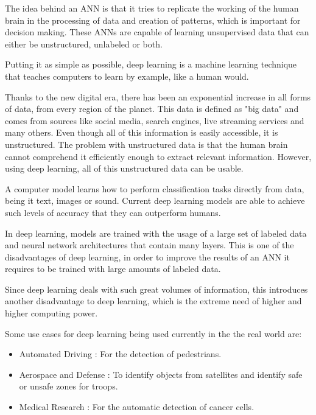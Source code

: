     \par The idea behind an ANN is that it tries to replicate the working of the human brain in the processing of data and creation of patterns, which is important for decision making. These ANNs are capable of learning unsupervised data that can either be unstructured, unlabeled or both. 
    
    \par Putting it as simple as possible, deep learning is a machine learning technique that teaches computers to learn by example, like a human would. \cite{mathworks_deeplearning}


    \par Thanks to the new digital era, there has been an exponential increase in all forms of data, from every region of the planet. This data is defined as "big data" and comes from sources like social media, search engines, live streaming services and many others. Even though all of this information is easily accessible, it is unstructured. The problem with unstructured data is that the human brain cannot comprehend it efficiently enough to extract relevant information. However, using deep learning, all of this unstructured data can be usable.

    \par A computer model learns how to perform classification tasks directly from data, being it text, images or sound. Current deep learning models are able to achieve such levels of accuracy that they can outperform humans.

    \par In deep learning, models are trained with the usage of a large set of labeled data and neural network architectures that contain many layers. This is one of the disadvantages of deep learning, in order to improve the results of an ANN it requires to be trained with large amounts of labeled data.

    \par Since deep learning deals with such great volumes of information, this introduces another disadvantage to deep learning, which is the extreme need of higher and higher computing power.

    \par Some use cases for deep learning being used currently in the the real world are:  \cite{mathworks_deeplearning}

    \begin{itemize}
        \item Automated Driving : For the detection of pedestrians.
        \item Aerospace and Defense : To identify objects from satellites and identify safe or unsafe zones for troops.
        \item Medical Research : For the automatic detection of cancer cells.
    \end{itemize} 

